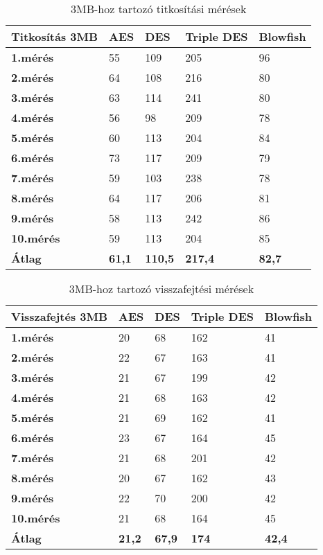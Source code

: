 \begin{table}[H]
	\centering
	\caption{3MB-hoz tartozó titkosítási mérések}
	\label{tab:enc_3mb}
	\medskip
	\begin{tabular}{|p{2.4cm}|p{2cm}|p{2cm}|p{2cm}|p{2cm}|}
		\hline
		\textbf{Titkosítás} \newline \textbf{3MB} & \textbf{AES} & \textbf{DES} & \textbf{Triple DES} & \textbf{Blowfish}\\
		\hline
		\textbf{1.mérés} & 55 & 109 & 205 & 96\\
		\hline
		\textbf{2.mérés} & 64 & 108 & 216 & 80\\
		\hline
		\textbf{3.mérés} & 63 & 114 & 241 & 80\\
		\hline
		\textbf{4.mérés} & 56 & 98 & 209 & 78\\
		\hline
		\textbf{5.mérés} & 60 & 113 & 204 & 84\\
		\hline
		\textbf{6.mérés} & 73 & 117 & 209 & 79\\
		\hline
		\textbf{7.mérés} & 59 & 103 & 238 & 78\\
		\hline
		\textbf{8.mérés} & 64 & 117 & 206 & 81\\
		\hline
		\textbf{9.mérés} & 58 & 113 & 242 & 86\\
		\hline
		\textbf{10.mérés} & 59 & 113 & 204 & 85\\
		\hline
		\hline
		\textbf{Átlag} & \textbf{61,1} & \textbf{110,5} & \textbf{217,4} & \textbf{82,7} \\
		\hline
	\end{tabular}
\end{table}

\begin{table}[H]
	\centering
	\caption{3MB-hoz tartozó visszafejtési mérések}
	\label{tab:dec_3mb}
	\medskip
	\begin{tabular}{|p{2.4cm}|p{2cm}|p{2cm}|p{2cm}|p{2cm}|}
		\hline
		\textbf{Visszafejtés} \newline \textbf{3MB} & \textbf{AES} & \textbf{DES} & \textbf{Triple DES} & \textbf{Blowfish}\\
		\hline
		\textbf{1.mérés} & 20 & 68 & 162 & 41\\
		\hline
		\textbf{2.mérés} & 22 & 67 & 163 & 41\\
		\hline
		\textbf{3.mérés} & 21 & 67 & 199 & 42\\
		\hline
		\textbf{4.mérés} & 21 & 68 & 163 & 42\\
		\hline
		\textbf{5.mérés} & 21 & 69 & 162 & 41\\
		\hline
		\textbf{6.mérés} & 23 & 67 & 164 & 45\\
		\hline
		\textbf{7.mérés} & 21 & 68 & 201 & 42\\
		\hline
		\textbf{8.mérés} & 20 & 67 & 162 & 43\\
		\hline
		\textbf{9.mérés} & 22 & 70 & 200 & 42\\
		\hline
		\textbf{10.mérés} & 21 & 68 & 164 & 45\\
		\hline
		\hline
		\textbf{Átlag} & \textbf{21,2} & \textbf{67,9} & \textbf{174} & \textbf{42,4}\\
		\hline
	\end{tabular}
\end{table}

